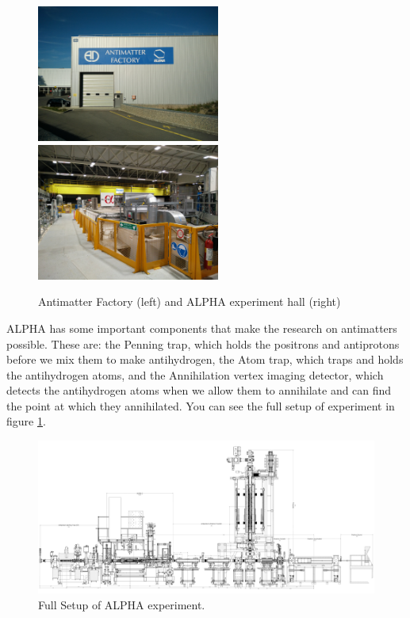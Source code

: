 \documentclass[12pt,a4paper]{article}
\begin{document}
\begin{figure}[h]

\includegraphics[width=60mm]{antimatter_factory}
\hspace{10mm}
\includegraphics[width=60mm]{alpha_hall}

\caption{Antimatter Factory (left) and ALPHA experiment hall (right)}
\end{figure}

ALPHA has some important components that make the research on antimatters possible. These are: the Penning trap, which holds the positrons and antiprotons before we mix them to make antihydrogen, the Atom trap, which traps and holds the antihydrogen atoms, and the Annihilation vertex imaging detector, which detects the antihydrogen atoms when we allow them to annihilate and can find the point at which they annihilated. You can see the full setup of experiment in figure \ref{fig:full_map}.

\begin{figure}[h]
\centering
\includegraphics[scale=0.09]{full_map}
\caption{Full Setup of ALPHA experiment.}
\label{fig:full_map}
\end{figure}
\end{document}
